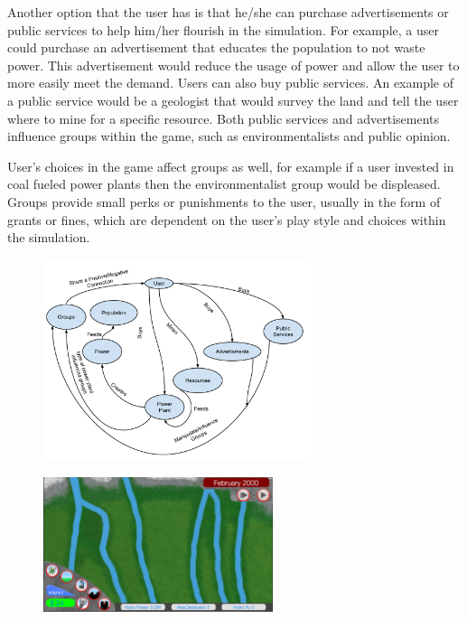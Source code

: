 \documentclass[msc,oneside]{ubcthesis}%
\begin{document}
Another option that the user has is that he/she can purchase advertisements or public services to help 
him/her flourish in the simulation. For example, a user could purchase an advertisement that educates the 
population to not waste power. This advertisement would reduce the usage of power and allow the user to 
more easily meet the demand. Users can also buy public services. An example of a public service would be a geologist that would 
survey the land and tell the user where to mine for a specific resource. Both public services and advertisements influence groups within the game, such as environmentalists and public opinion. 
\bigskip

User's choices in the game affect groups as well, for example if a user invested in coal fueled power plants then the environmentalist group would be displeased. Groups provide small perks or punishments to the user, usually in the form of grants or fines, which are dependent on the user's play style and choices within the simulation. 
\begin{figure}[hbt]
  \begin{center}
    \includegraphics[width=0.7\textwidth]{DFDDiagram}
    \caption[System diagram]{\label{DFD Diagram} }
  \end{center}
\end{figure}


\begin{figure}[hbt]
  \begin{center}
    \includegraphics[width=0.6\textwidth]{panel}
    \caption[In game navigation panal]{\label{control panel} }
  \end{center}
\end{figure}
\end{document}
